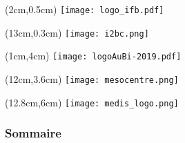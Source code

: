 \begin{frame}
  \titlepage
  \begin{textblock*}{5cm}(2cm,0.5cm) %
  \texttt{[image: logo\_ifb.pdf]}
  \end{textblock*}
  \begin{textblock*}{5cm}(13cm,0.3cm) %
  \texttt{[image: i2bc.png]}
  \end{textblock*}
  \begin{textblock*}{5cm}(1cm,4cm) %
  \texttt{[image: logoAuBi-2019.pdf]}
  \end{textblock*}
  \begin{textblock*}{5cm}(12cm,3.6cm) %
  \texttt{[image: mesocentre.png]}
  \end{textblock*}
   \begin{textblock*}{5cm}(12.8cm,6cm) %
  \texttt{[image: medis\_logo.png]}
  \end{textblock*}
\end{frame}
\begin{frame}
  \frametitle{Sommaire}
   \tableofcontents
\end{frame}
